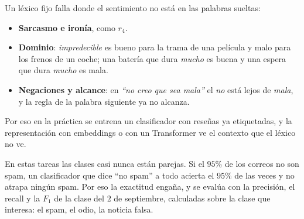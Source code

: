\documentclass[11pt,letterpaper]{article}
\begin{document}
\begin{ejemplo}
\begin{center}
    \end{center}
\end{ejemplo}

\begin{ojo}
    Un léxico fijo falla donde el sentimiento no está en las palabras
    sueltas:
    \begin{itemize}[itemsep=0.2em]
        \item \textbf{Sarcasmo e ironía}, como $r_4$.
        \item \textbf{Dominio}: \textit{impredecible} es bueno para la
              trama de una película y malo para los frenos de un
              coche; una batería que dura \textit{mucho} es buena y una
              espera que dura \textit{mucho} es mala.
        \item \textbf{Negaciones y alcance}: en \textit{``no creo que
              sea mala''} el \textit{no} está lejos de \textit{mala}, y
              la regla de la palabra siguiente ya no alcanza.
    \end{itemize}
    Por eso en la práctica se entrena un clasificador con reseñas ya
    etiquetadas, y la representación con embeddings o con un
    Transformer ve el contexto que el léxico no ve.
\end{ojo}

\begin{idea}
    En estas tareas las clases casi nunca están parejas. Si el $95\%$
    de los correos no son spam, un clasificador que dice ``no spam'' a
    todo acierta el $95\%$ de las veces y no atrapa ningún spam. Por
    eso la exactitud engaña, y se evalúa con la precisión, el recall
    y la $F_1$ de la clase del $2$ de septiembre, calculadas sobre la
    clase que interesa: el spam, el odio, la noticia falsa.
\end{idea}
\end{document}
